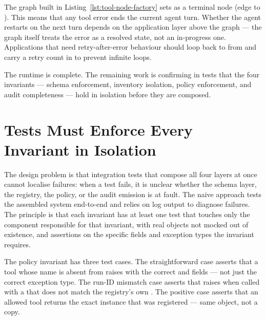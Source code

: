 \begin{notebox}
The graph built in Listing~\ref{lst:tool-node-factory} sets
 as a terminal node (edge to ). This
means that any tool error ends the current agent turn. Whether the agent
restarts on the next turn depends on the application layer above the
graph --- the graph itself treats the error as a resolved state, not an
in-progress one. Applications that need retry-after-error behaviour should
loop back to  from  and carry
a retry count in  to prevent infinite loops.
\end{notebox}

The runtime is complete. The remaining work is confirming in tests that
the four invariants --- schema enforcement, inventory isolation, policy
enforcement, and audit completeness --- hold in isolation before they are
composed.


\section{Tests Must Enforce Every Invariant in Isolation}
\label{sec:tool-tests}

The design problem is that integration tests that compose all four layers
at once cannot localise failures: when a test fails, it is unclear whether
the schema layer, the registry, the policy, or the audit emission is at
fault. The naive approach tests the assembled system end-to-end and relies
on log output to diagnose failures. The principle is that each invariant
has at least one test that touches only the component responsible for that
invariant, with real objects not mocked out of existence, and assertions on
the specific fields and exception types the invariant requires.

The policy invariant has three test cases. The straightforward case asserts
that a tool whose name is absent from 
raises  with the correct  and
 fields --- not just the correct exception type. The
run-ID mismatch case asserts that  raises
 when called with a  that does
not match the registry's own . The positive case asserts that
an allowed tool returns the exact  instance that was
registered --- same object, not a copy.

